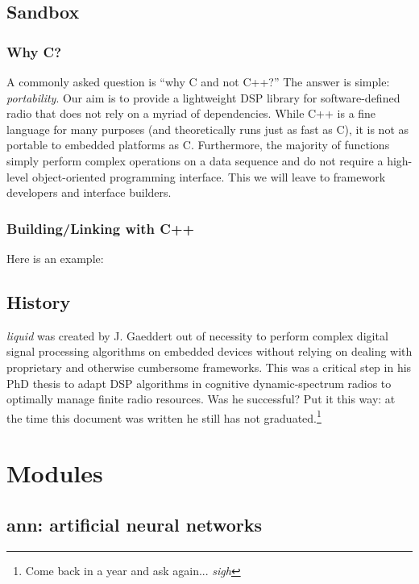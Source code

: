 \documentclass[11pt,twoside]{report}
\begin{document}
\section{Sandbox}

\subsection{Why C?}
A commonly asked question is ``why C and not C++?''
The answer is simple: {\em portability}.
Our aim is to provide a lightweight DSP library for software-defined radio
that does not rely on a myriad of dependencies.
While C++ is a fine language for many purposes (and theoretically runs just as
fast as C), it is not as portable to embedded platforms as C.
Furthermore, the majority of functions simply perform complex operations on a
data sequence and do not require a high-level object-oriented programming
interface.
This we will leave to framework developers and interface builders.

\subsection{Building/Linking with C++}
Here is an example:


\section{History}
{\em liquid} was created by J. Gaeddert out of necessity to perform complex
digital signal processing algorithms on embedded devices
without relying on dealing
with proprietary and otherwise cumbersome frameworks.
This was a critical step in his PhD thesis to adapt DSP algorithms in
cognitive dynamic-spectrum radios to optimally manage finite radio resources.
Was he successful?
Put it this way: at the time this document was written he still has not
graduated.\footnote{Come back in a year and ask again... {\em sigh}}

%
%
\chapter{Modules}
\label{ch:modules}




\section{ann: artificial neural networks}
\end{document}
